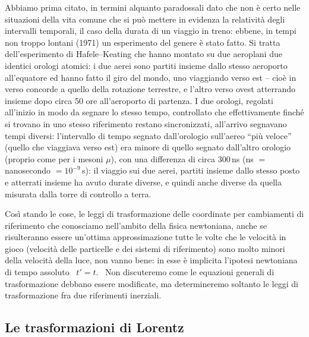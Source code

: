 Abbiamo prima citato, in termini alquanto paradossali dato che non \`e certo
nelle situazioni della vita comune che si pu\`o mettere in evidenza la
relativit\`a degli intervalli temporali, il caso della durata di un viaggio in
treno: ebbene, in tempi non troppo lontani (1971) un esperimento del genere \`e
stato fatto. Si tratta dell'esperimento di Hafele--Keating che hanno montato su
due aeroplani due identici orologi atomici: i due aerei sono partiti insieme
dallo stesso aeroporto all'equatore ed hanno fatto il giro del mondo, uno
viaggiando verso est -- cio\`e in verso concorde a quello della rotazione
terrestre, e l'altro verso ovest atterrando insieme dopo circa 50 ore
all'aeroporto di partenza. I due orologi, regolati all'inizio in modo da segnare
lo stesso tempo, controllato che effettivamente finch\'e si trovano in uno
stesso riferimento restano sincronizzati, all'arrivo segnavano tempi diversi:
l'intervallo di tempo segnato dall'orologio sull'aereo ``pi\`u veloce'' (quello
che viaggiava verso est) era minore di quello segnato dall'altro orologio
(proprio come per i mesoni $\mu$), con una differenza di circa 300\,ns
(ns $=$ nanosecondo $=10^{-9}$\,s): il viaggio sui due aerei, partiti insieme
dallo stesso posto e atterrati insieme ha avuto durate diverse, e quindi anche
diverse da quella misurata dalla torre di controllo a terra.

Cos\`i stando le cose, le leggi di trasformazione delle coordinate per
cambiamenti di riferimento che conosciamo nell'ambito della fisica newtoniana,
anche se risulteranno essere un'ottima approssimazione tutte le volte che le
velocit\`a in gioco (velocit\`a delle particelle e dei sistemi di riferimento)
sono molto minori della velocit\`a della luce, non vanno bene: in esse \`e
implicita l'ipotesi newtoniana di tempo assoluto \ $t'=t$. \ Non discuteremo
come le equazioni generali di trasformazione debbano essere modificate, ma
determineremo soltanto le leggi di trasformazione fra due riferimenti inerziali.

\subsection{Le trasformazioni di Lorentz}


